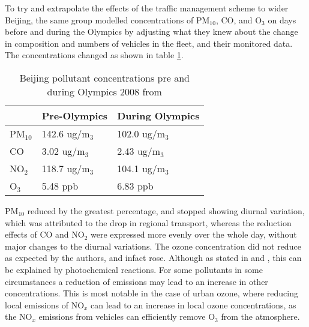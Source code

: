 To try and extrapolate the effects of the traffic management scheme to wider Beijing, the same group modelled concentrations of PM$_{10}$, CO, and O$_{3}$ on days before and during the Olympics by adjusting what they knew about the change in composition and numbers of vehicles in the fleet, and their monitored data. The concentrations changed as shown in table \ref{tab:beijing_olympic_pollutants}.

\begin{table}[H]
\centering
    \begin{tabular}{ | l | l | l |}
    \hline 
     & \bfseries{Pre-Olympics} & \bfseries{During Olympics} \\ \hline
     PM$_{10}$ & 142.6 ug/m$_{3}$ & 102.0 ug/m$_{3}$\\ \hline
     CO & 3.02 ug/m$_{3}$ & 2.43 ug/m$_{3}$\\ \hline
     NO$_{2}$ & 118.7 ug/m$_{3}$ & 104.1 ug/m$_{3}$\\ \hline
     O$_{3}$ & 5.48 ppb & 6.83 ppb\\ \hline
    \end{tabular}
\caption{Beijing pollutant concentrations pre and during Olympics 2008 from \cite{Wang2009}}
\label{tab:beijing_olympic_pollutants}
\end{table}

PM$_{10}$ reduced by the greatest percentage, and stopped showing diurnal variation, which was attributed to the drop in regional transport, whereas the reduction effects of CO and NO$_{2}$ were expressed more evenly over the whole day, without major changes to the diurnal variations. The ozone concentration did not reduce as expected by the authors, and infact rose. Although as stated in \cite{DEFRA2007} and \cite{Holman1999}, this can be explained by photochemical reactions. For some pollutants in some circumstances a reduction of emissions may lead to an increase in other concentrations. This is most notable in the case of urban ozone, where reducing local emissions of NO$_{x}$ can lead to an increase in local ozone concentrations, as the NO$_{x}$ emissions from vehicles can efficiently remove O$_{3}$ from the atmosphere.